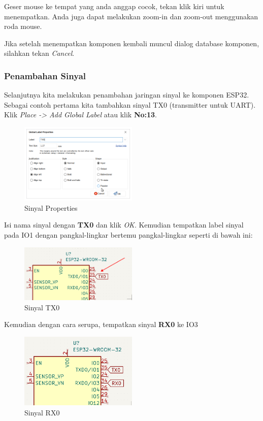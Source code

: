 \documentclass[12pt]{book}
\begin{document}
	Geser mouse ke tempat yang anda anggap cocok, tekan klik kiri untuk menempatkan.
	Anda juga dapat melakukan zoom-in dan zoom-out menggunakan roda mouse.

	Jika setelah menempatkan komponen kembali muncul dialog database komponen, silahkan tekan \textit{Cancel}.

	\newpage
	\subsubsection{Penambahan Sinyal}

	Selanjutnya kita melakukan penambahan jaringan sinyal ke komponen ESP32.
	Sebagai contoh pertama kita tambahkan sinyal TX0 (transmitter untuk UART).
	Klik \textit{Place -> Add Global Label} atau klik \textbf{No:13}.

	\begin{figure}[!ht]
		\centering
		\includegraphics[width=0.5\textwidth]{images/sch/sch_4}
		\caption{Sinyal Properties}
	\end{figure}

	Isi nama sinyal dengan \textbf{TX0} dan klik \textit{OK}.
	Kemudian tempatkan label sinyal pada IO1 dengan pangkal-lingkar bertemu pangkal-lingkar seperti di bawah ini:

	\begin{figure}[!ht]
		\centering
		\includegraphics[width=0.5\textwidth]{images/sch/sch_5}
		\caption{Sinyal TX0}
	\end{figure}

	Kemudian dengan cara serupa, tempatkan sinyal \textbf{RX0} ke IO3

	\begin{figure}[!ht]
		\centering
		\includegraphics[width=0.5\textwidth]{images/sch/sch_6}
		\caption{Sinyal RX0}
	\end{figure}
\end{document}
